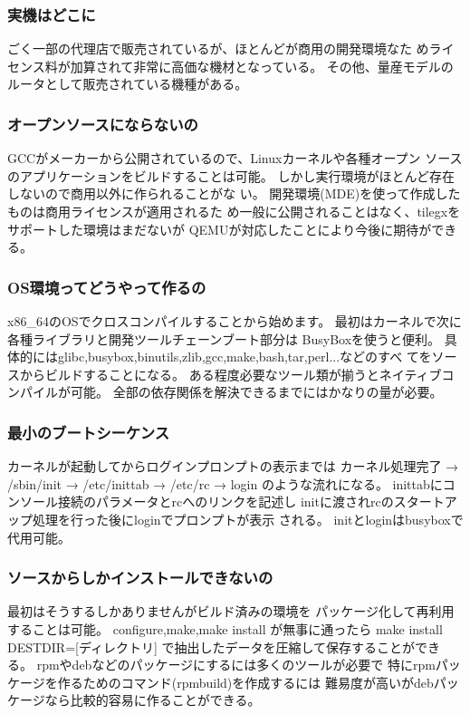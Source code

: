 \documentclass[mingoth,a4paper]{jsarticle}
\begin{document}
\subsubsection{実機はどこに}
ごく一部の代理店で販売されているが、ほとんどが商用の開発環境なた
めライセンス料が加算されて非常に高価な機材となっている。
その他、量産モデルのルータとして販売されている機種がある。 

\subsubsection{オープンソースにならないの}
GCCがメーカーから公開されているので、Linuxカーネルや各種オープン
ソースのアプリケーションをビルドすることは可能。
しかし実行環境がほとんど存在しないので商用以外に作られることがな
い。
開発環境(MDE)を使って作成したものは商用ライセンスが適用されるた
め一般に公開されることはなく、tilegxをサポートした環境はまだないが
QEMUが対応したことにより今後に期待ができる。 

\subsubsection{OS環境ってどうやって作るの}
x86\_64のOSでクロスコンパイルすることから始めます。
最初はカーネルで次に各種ライブラリと開発ツールチェーンブート部分は
BusyBoxを使うと便利。
具体的にはglibc,busybox,binutils,zlib,gcc,make,bash,tar,perl...などのすべ
てをソースからビルドすることになる。
ある程度必要なツール類が揃うとネイティブコンパイルが可能。
全部の依存関係を解決できるまでにはかなりの量が必要。 

\subsubsection{最小のブートシーケンス}
カーネルが起動してからログインプロンプトの表示までは
カーネル処理完了  → /sbin/init → /etc/inittab → /etc/rc → login
のような流れになる。
inittabにコンソール接続のパラメータとrcへのリンクを記述し
initに渡されrcのスタートアップ処理を行った後にloginでプロンプトが表示
される。
initとloginはbusyboxで代用可能。 

\subsubsection{ソースからしかインストールできないの}
最初はそうするしかありませんがビルド済みの環境を
パッケージ化して再利用することは可能。
configure,make,make  install が無事に通ったら
make install DESTDIR=[ディレクトリ] 
で抽出したデータを圧縮して保存することができる。
rpmやdebなどのパッケージにするには多くのツールが必要で
特にrpmパッケージを作るためのコマンド(rpmbuild)を作成するには
難易度が高いがdebパッケージなら比較的容易に作ることができる。 
\end{document}
